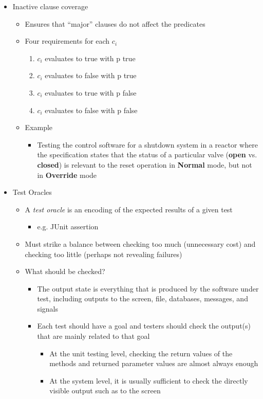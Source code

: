 \documentclass[11pt]{article}
\begin{document}
\begin{itemize}
\begin{itemize}
		\end{itemize}

	\item Inactive clause coverage
		\begin{itemize}
			\item Ensures that “major” clauses do not affect the predicates
			\item Four requirements for each $ c_i $
				\begin{enumerate}
					\item $c_i$ evaluates to true with p true
					\item $c_i$ evaluates to false with p true
					\item $c_i$ evaluates to true with p false
					\item $c_i$ evaluates to false with p false
				\end{enumerate}
			\item Example
				\begin{itemize}
					\item Testing the control software for a shutdown system in a reactor where the specification states that the status of a particular valve (\textbf{open} vs. \textbf{closed}) is relevant to the reset operation in \textbf{Normal} mode, but not in \textbf{Override} mode
				\end{itemize}
		\end{itemize}

	\item Test Oracles
		\begin{itemize}
			\item A \textit{test oracle} is an encoding of the expected results of a given test
				\begin{itemize}
					\item e.g. JUnit assertion
				\end{itemize}
			\item Must strike a balance between checking too much (unnecessary cost) and checking too little (perhaps not revealing failures)
			\item What should be checked?
				\begin{itemize}
					\item The output state is everything that is produced by the software under test, including outputs to the screen, file, databases, messages, and signals
					\item Each test should have a goal and testers should check the output(s) that are mainly related to that goal
						\begin{itemize}
							\item At the unit testing level, checking the return values of the methods and returned parameter values are almost always enough
							\item At the system level, it is usually sufficient to check the directly visible output such as to the screen
						\end{itemize}
				\end{itemize}


\end{itemize}
\end{itemize}
\end{document}
